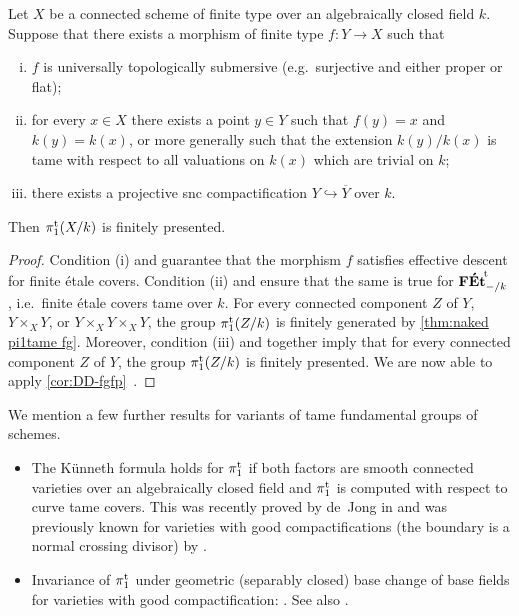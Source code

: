 \begin{thm} \label{thm:naked pi1tame fp}
    Let $X$ be a connected scheme of finite type over an algebraically closed field $k$. Suppose that there exists a morphism of finite type $f\colon Y\to X$ such that 
    \begin{enumerate}[(i)]
        \item 
        $f$ is universally topologically submersive (e.g.\ surjective and either proper or flat);
        
        \item 
        for every $x\in X$ there exists a point $y\in Y$ such that $f(y)=x$ and $k(y)=k(x)$, or more generally such that the extension $k(y)/k(x)$ is tame with respect to all valuations on $k(x)$ which are trivial on $k$;
        
        \item 
        there exists a projective snc compactification $Y \hookrightarrow \overline{Y}$ over $k$.
    \end{enumerate}
     Then $\pi_1^{\mathrm{t}}(X/k)$ is finitely presented.
\end{thm}

\begin{proof}
Condition (i) and  guarantee that the morphism $f$ satisfies effective descent for finite \'etale covers. Condition (ii) and  ensure that the same is true for ${\mathbf{F\acute{E}t}}^{\!\mathrm{t}}_{-/k}$, i.e.\ finite \'etale covers tame over $k$. For every connected component $Z$ of $Y$, $Y\times_X Y$, or $Y\times_X Y\times_X Y$, the group $\pi_1^{\mathrm{t}}(Z/k)$ is finitely generated by \cref{thm:naked pi1tame fg}. Moreover, condition (iii) and \cite[Theorem~1.1]{EsnaultShustermanSrinivas2022:FinitePresentationTame} together imply that for every connected component $Z$ of $Y$, the group $\pi_1^{\mathrm{t}}(Z/k)$ is finitely presented. We are now able to apply \cref{cor:DD-fgfp}~.
\end{proof}

\begin{rmk}
    We mention a few further results for variants of tame fundamental groups of schemes.
    \begin{itemize}
        \item 
        The K\"unneth formula holds for $\pi_1^{\mathrm{t}}$ if both factors are smooth connected varieties over an algebraically closed field and $\pi_1^{\mathrm{t}}$ is computed with respect to curve tame covers. This was recently proved by de~Jong in \cite[Theorem A.1]{deJong2026:KuennethForPitameAppendixJLR2026} and was previously known for varieties with good compactifications (the boundary is a normal crossing divisor) by  
        \cite[Th\'eor\`eme~5.1]{Orgogozo2003:AlterationsGroupeFondamental}. 
        \item 
        Invariance of $\pi_1^{\mathrm{t}}$ under geometric (separably closed) base change of base fields for varieties with good compactification: \cite[Remarque~5.3]{Orgogozo2003:AlterationsGroupeFondamental}. See also \cite{Landesman}.
    \end{itemize}
\end{rmk}
